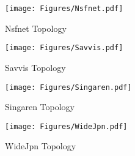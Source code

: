 \begin{figure}[htbp]
    \centering
    \texttt{[image: Figures/Nsfnet.pdf]}
    \caption{Nsfnet Topology}
    \label{fig:Nsfnet}
\end{figure}

\begin{figure}[htbp]
    \centering
    \texttt{[image: Figures/Savvis.pdf]}
    \caption{Savvis Topology}
    \label{fig:Savvis}
\end{figure}

\begin{figure}[htbp]
    \centering
    \texttt{[image: Figures/Singaren.pdf]}
    \caption{Singaren Topology}
    \label{fig:Singaren}
\end{figure}

\begin{figure}[htbp]
    \centering
    \texttt{[image: Figures/WideJpn.pdf]}
    \caption{WideJpn Topology}
    \label{fig:WideJpn}
\end{figure}
